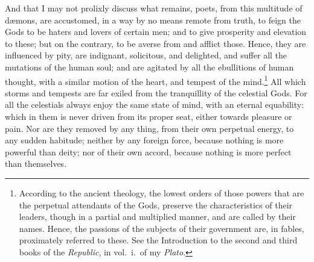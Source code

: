 \documentclass[twoside]{article}
\begin{document}
\noindent And that I may not prolixly discuss what remains, poets, from this
multitude of d{\ae}mons, are accustomed, in a way by no means remote from
truth, to feign the Gods to be haters and lovers of certain men; and to give
prosperity and elevation to these; but on the contrary, to be averse from and
afflict those. Hence, they are influenced by pity, are indignant, solicitous,
and delighted, and suffer all the mutations of the human soul; and are agitated
by all the ebullitions of human thought, with a similar motion of the heart,
and tempest of the mind.\footnote{According to the ancient theology, the lowest
orders of those powers that are the perpetual attendants of the Gods, preserve
the characteristics of their leaders, though in a partial and multiplied
manner, and are called by their names. Hence, the passions of the subjects of
their government are, in fables, proximately referred to these. See the
Introduction to the second and third books of the \textit{Republic}, in
vol.~i.~of my \textit{Plato}.} All which storms and tempests are far exiled
from the tranquillity of the celestial Gods. For all the celestials always
enjoy the same state of mind, with an eternal equability: which in them is
never driven from its proper seat, either towards pleasure or pain. Nor are
they removed by any thing, from their own perpetual energy, to any sudden
habitude; neither by any foreign force, because nothing is more powerful than
deity; nor of their own accord, because nothing is more perfect than
themselves.
\end{document}
